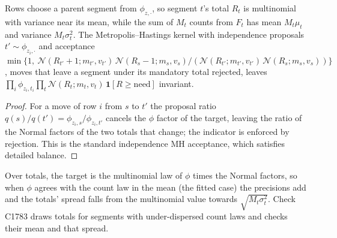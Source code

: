 \setcounter{proposition}{1782}
\begin{proposition}\label{prop:segtotals}
Rows choose a parent segment from $\phi_{z,\cdot}$, so segment $t$'s total $R_t$ is multinomial with variance near its mean, while the sum of $M_t$ counts from $F_t$ has mean $M_t\mu_t$ and variance $M_t\sigma_t^2$. The Metropolis--Hastings kernel with independence proposals $t'\sim\phi_{z_i,\cdot}$ and acceptance $\min\{1,\ \mathcal N(R_{t'}+1;m_{t'},v_{t'})\,\mathcal N(R_s-1;m_s,v_s)/(\mathcal N(R_{t'};m_{t'},v_{t'})\,\mathcal N(R_s;m_s,v_s))\}$, moves that leave a segment under its mandatory total rejected, leaves $\prod_i\phi_{z_i,t_i}\prod_t\mathcal N(R_t;m_t,v_t)\,\mathbf 1[R\ge\mathrm{need}]$ invariant.
\end{proposition}
\begin{proof}
For a move of row $i$ from $s$ to $t'$ the proposal ratio $q(s)/q(t')=\phi_{z_i,s}/\phi_{z_i,t'}$ cancels the $\phi$ factor of the target, leaving the ratio of the Normal factors of the two totals that change; the indicator is enforced by rejection. This is the standard independence MH acceptance, which satisfies detailed balance.
\end{proof}
\noindent Over totals, the target is the multinomial law of $\phi$ times the Normal factors, so when $\phi$ agrees with the count law in the mean (the fitted case) the precisions add and the totals' spread falls from the multinomial value towards $\sqrt{M_t\sigma_t^2}$. Check C1783 draws totals for segments with under-dispersed count laws and checks their mean and that spread.


